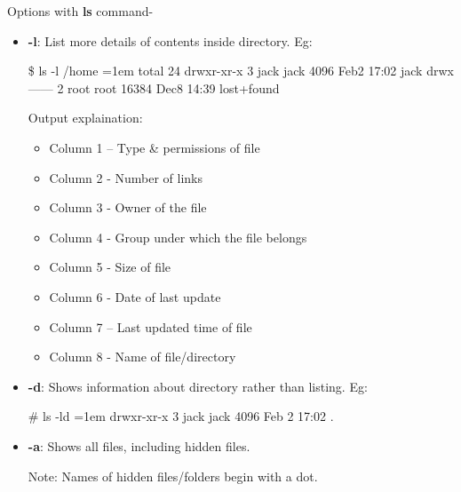 \begin{flushleft}
\begin{enumerate}
		Options with \textbf{ls} command-
		\begin{itemize}		
			\item \textbf{-l}: List more details of contents inside directory.
			\newline
			Eg:
			\begin{tcolorbox}[breakable,notitle,boxrule=-0pt,colback=black,colframe=black]
				\color{green}
				\$ ls -l /home
				\color{white}
				\small
				\font=1em
				\newline
				total 24
				\newline
				drwxr-xr-x    3    jack   jack    4096 Feb2 17:02 jack
				\newline
				drwx------  2 root   root   16384 Dec8 14:39 lost+found
			\end{tcolorbox}
			Output explaination:
			\begin{itemize}
			\item Column 1 – Type \& permissions of file
				\item Column 2 - Number of links
				\item Column 3 - Owner of the file
				\item Column 4 - Group under which the file belongs
				\item Column 5 - Size of file
				\item Column 6 - Date of last update
				\item Column 7 – Last updated time of file
				\item Column 8 - Name of file/directory
			\end{itemize}
			\item \textbf{-d}: Shows information about directory rather than listing.
			\newline
			Eg:
			\begin{tcolorbox}[breakable,notitle,boxrule=-0pt,colback=black,colframe=black]
				\color{green}
				\# ls -ld 
				\color{white}
				\font=1em
				\newline
				drwxr-xr-x 3 jack jack 4096 Feb  2 17:02 .
				\font=4pt
			\end{tcolorbox}
		
			\item \textbf{-a}: Shows all files, including hidden files. 
			\bigskip
			\begin{tcolorbox}[breakable,notitle,boxrule=-0pt,colback=yellow,colframe=yellow]
				\color{black}
				Note: Names of hidden files/folders begin with a dot.
			\end{tcolorbox}
			

\end{itemize}
\end{enumerate}
\end{flushleft}
